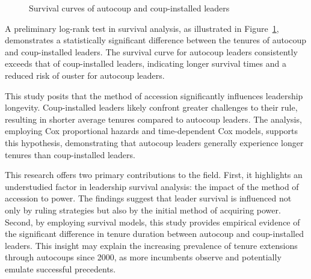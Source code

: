 \documentclass[
  12pt,
]{report}
\begin{document}
\begin{figure}


\caption{\label{fig-logrank}Survival curves of autocoup and
coup-installed leaders}

\end{figure}%

A preliminary log-rank test in survival analysis, as illustrated in
Figure~\ref{fig-logrank}, demonstrates a statistically significant
difference between the tenures of autocoup and coup-installed leaders.
The survival curve for autocoup leaders consistently exceeds that of
coup-installed leaders, indicating longer survival times and a reduced
risk of ouster for autocoup leaders.

This study posits that the method of accession significantly influences
leadership longevity. Coup-installed leaders likely confront greater
challenges to their rule, resulting in shorter average tenures compared
to autocoup leaders. The analysis, employing Cox proportional hazards
and time-dependent Cox models, supports this hypothesis, demonstrating
that autocoup leaders generally experience longer tenures than
coup-installed leaders.

This research offers two primary contributions to the field. First, it
highlights an understudied factor in leadership survival analysis: the
impact of the method of accession to power. The findings suggest that
leader survival is influenced not only by ruling strategies but also by
the initial method of acquiring power. Second, by employing survival
models, this study provides empirical evidence of the significant
difference in tenure duration between autocoup and coup-installed
leaders. This insight may explain the increasing prevalence of tenure
extensions through autocoups since 2000, as more incumbents observe and
potentially emulate successful precedents.
\end{document}
